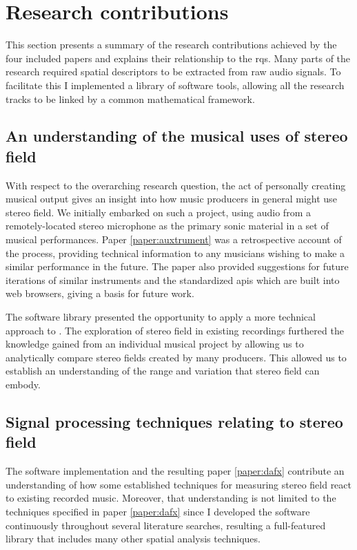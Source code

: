 \section{Research contributions}
This section presents a summary of the research contributions achieved by the four included papers and explains their relationship to the \glspl{rq}. Many parts of the research required spatial descriptors to be extracted from raw audio signals. To facilitate this I implemented a library of software tools, allowing all the research tracks to be linked by a common mathematical framework.

\subsection{An understanding of the musical uses of stereo field}
With respect to the overarching research question, the act of personally creating musical output gives an insight into how music producers in general might use stereo field. We initially embarked on such a project, using audio from a remotely-located stereo microphone as the primary sonic material in a set of musical performances. Paper \ref{paper:auxtrument} was a retrospective account of the process, providing technical information to any musicians wishing to make a similar performance in the future. The paper also provided suggestions for future iterations of similar instruments and the standardized \glspl{api} which are built into web browsers, giving a basis for future work.

The software library presented the opportunity to apply a more technical approach to \rqa{}. The exploration of stereo field in existing recordings furthered the knowledge gained from an individual musical project by allowing us to analytically compare stereo fields created by many producers. This allowed us to establish an understanding of the range and variation that stereo field can embody.

\subsection{Signal processing techniques relating to stereo field}
The software implementation and the resulting paper \ref{paper:dafx} contribute an understanding of how some established techniques for measuring stereo field react to existing recorded music. Moreover, that understanding is not limited to the techniques specified in paper \ref{paper:dafx} since I developed the software continuously throughout several literature searches, resulting a full-featured library that includes many other spatial analysis techniques.

